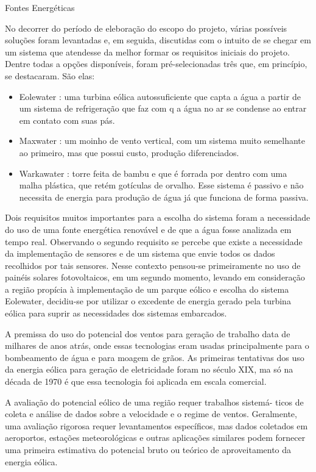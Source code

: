\documentclass[12pt,openright,oneside,a4paper,brazil]{abntex2}
\begin{document}
\begin{center}
 {\large Fontes Energéticas}\\[0.2cm]
 \end{center}
 No decorrer do período de eleboração do escopo do projeto, várias possíveis soluções foram levantadas e, em seguida, discutidas com o intuito de se chegar em um sistema que atendesse da melhor formar os requisitos iniciais do projeto. Dentre todas a opções disponíveis, foram pré-selecionadas três que, em princípio, se destacaram. São elas:
\begin{itemize}

\item Eolewater : uma turbina eólica autossuficiente que capta a água a partir de um sistema de refrigeração que faz com q a água no ar se condense ao entrar em contato com suas pás.
\item Maxwater : um moinho de vento vertical, com um sistema muito semelhante ao primeiro, mas que possui custo, produção diferenciados.
\item Warkawater : torre feita de bambu e que é forrada por dentro com uma malha plástica, que retém gotículas de orvalho. Esse sistema é passivo e não necessita de energia para produção de água já que funciona de forma passiva.
\end{itemize} 

Dois requisitos muitos importantes para a escolha do sistema foram a necessidade do uso de uma fonte energética renovável e de que a água fosse analizada em tempo real. Observando o segundo requisito se percebe que existe a necessidade da implementação de sensores e de um sistema que envie todos os dados recolhidos por tais sensores. Nesse contexto pensou-se primeiramente no uso de painéis solares fotovoltaicos, em um segundo momento, levando em consideração a região propícia à implementação de um parque eólico e escolha do sistema Eolewater, decidiu-se por utilizar o excedente de energia gerado pela turbina eólica para suprir as necessidades dos sistemas embarcados.

A premissa do uso do potencial dos ventos para geração de trabalho data de milhares de anos atrás, onde essas tecnologias eram usadas principalmente para o bombeamento de água e para moagem de grãos. As primeiras tentativas dos uso da energia eólica para geração de eletricidade foram no século XIX, ma só na década de 1970 é que essa tecnologia foi aplicada em escala comercial.

A avaliação do potencial eólico de uma região requer trabalhos sistemá- ticos de coleta e análise de dados sobre a velocidade e o regime de ventos. Geralmente, uma avaliação rigorosa requer levantamentos específicos, mas dados coletados em aeroportos, estações meteorológicas e outras aplicações similares podem fornecer uma primeira estimativa do potencial bruto ou teórico de aproveitamento da energia eólica.
\end{document}
